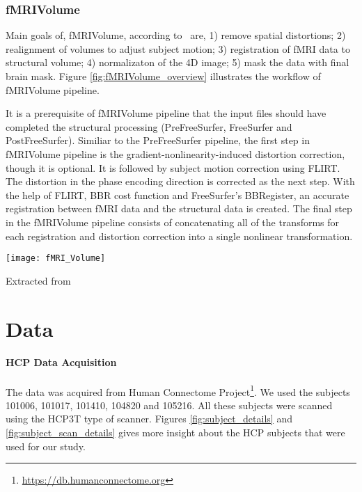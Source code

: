 

\subsubsection{fMRIVolume}
Main goals of, fMRIVolume, according to~\cite{Gla13} are, 1) remove spatial distortions; 2) realignment of volumes to adjust subject motion; 3) registration of fMRI data to structural volume; 4) normalizaton of the 4D image; 5) mask the data with final brain mask. Figure \ref{fig:fMRIVolume_overview} illustrates the workflow of fMRIVolume pipeline.

It is a prerequisite of fMRIVolume pipeline that the input files should have completed the structural processing (PreFreeSurfer, FreeSurfer and PostFreeSurfer). Similiar to the PreFreeSurfer pipeline, the first step in fMRIVolume pipeline is the gradient-nonlinearity-induced distortion correction, though it is optional. It is followed by subject motion correction using FLIRT. The distortion in the phase encoding direction is corrected as the next step. With the help of FLIRT, BBR cost function and FreeSurfer's BBRegister, an accurate registration between fMRI data and the structural data is created. The final step in the fMRIVolume pipeline consists of concatenating all of the transforms for each registration and distortion correction into a single nonlinear transformation.

\begin{center}
  \texttt{[image: fMRI\_Volume]}
  \label{fig:fMRIVolume_overview}
  \caption*{Extracted from \cite{Gla13}}
\end{center}

\section{Data}
\paragraph{HCP Data Acquisition}
The data was acquired from Human Connectome Project\footnote{\url{https://db.humanconnectome.org}}. We used the subjects 101006, 101017, 101410, 104820 and 105216. All these subjects were scanned using the HCP3T type of scanner. Figures \ref{fig:subject_details} and \ref{fig:subject_scan_details} gives more insight about the HCP subjects that were used for our study. 

